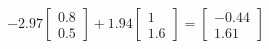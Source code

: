 \documentclass[preview]{standalone}
\begin{document}
\begin{align*}
-2.97 \begin{bmatrix} 0.8 \\ 0.5 \end{bmatrix} + 1.94 \begin{bmatrix} 1 \\ 1.6 \end{bmatrix} = \begin{bmatrix} -0.44 \\ 1.61 \end{bmatrix}
\end{align*}
\end{document}
